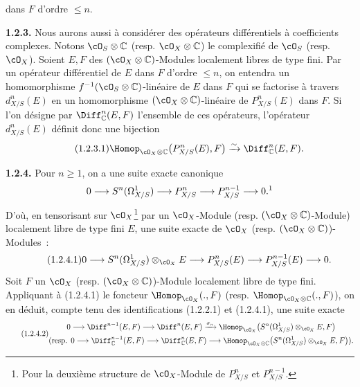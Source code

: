 dans $F$ d'ordre $\le n$.

\textbf{1.2.3.} Nous aurons aussi à considérer des opérateurs différentiels à coefficients complexes. Notons $\cO_S\otimes\mathbb C$ (resp. $\cO_X\otimes\mathbb C$) le complexifié de $\cO_S$ (resp. $\cO_X$). Soient $E,F$ des $(\cO_X\otimes\mathbb C)$-Modules localement libres de type fini. Par un opérateur différentiel de $E$ dans $F$ d'ordre $\le n$, on entendra un homomorphisme $f^{-1}(\cO_S\otimes\mathbb C)$-linéaire de $E$ dans $F$ qui se factorise à travers $d^n_{X/S}(E)$ en un homomorphisme $(\cO_X\otimes\mathbb C)$-linéaire de $P^n_{X/S}(E)$ dans $F$. Si l'on désigne par $\Diff^n_\mathbb C(E,F)$ l'ensemble de ces opérateurs, l'opérateur $d^n_{X/S}(E)$ définit donc une bijection
\begin{equation}\tag{1.2.3.1}
  \Homop_{\cO_X\otimes\mathbb C}\bigl(P^n_{X/S}(E),F\bigr)
  \xrightarrow{\sim}
  \Diff^n_\mathbb C(E,F).
\end{equation}

\textbf{1.2.4.} Pour $n\ge1$, on a une suite exacte canonique
\[
  0\longrightarrow S^n(\Omega^1_{X/S})
  \longrightarrow P^n_{X/S}
  \longrightarrow P^{n-1}_{X/S}
  \longrightarrow 0.\text{\footnotemark}
\]
%
D'où, en tensorisant sur $\cO_X$\footnote{Pour la deuxième structure de $\cO_X$-Module de $P^n_{X/S}$ et $P^{n-1}_{X/S}$.} par un $\cO_X$-Module (resp. $(\cO_X\otimes\mathbb C)$-Module) localement libre de type fini $E$, une suite exacte de $\cO_X$ (resp. $(\cO_X\otimes\mathbb C)$)-Modules~:
\begin{equation}\tag{1.2.4.1}
  0\longrightarrow S^n(\Omega^1_{X/S})\otimes_{\cO_X}E
  \longrightarrow P^n_{X/S}(E)
  \longrightarrow P^{n-1}_{X/S}(E)
  \longrightarrow 0.
\end{equation}
Soit $F$ un $\cO_X$ (resp. $(\cO_X\otimes\mathbb C)$)-Module localement libre de type fini. Appliquant à (1.2.4.1) le foncteur $\Homop_{\cO_X}(.,F)$ (resp. $\Homop_{\cO_X\otimes\mathbb C}(.,F)$), on en déduit, compte tenu des identifications (1.2.2.1) et (1.2.4.1), une suite exacte
\begin{equation}\tag{1.2.4.2}
\begin{gathered}
  0\longrightarrow \Diff^{n-1}(E,F)
  \longrightarrow \Diff^n(E,F)
  \xrightarrow{\sigma_n}
  \Homop_{\cO_X}\bigl(S^n(\Omega^1_{X/S})\otimes_{\cO_X}E,F\bigr)\\
  (\text{resp. } 0\longrightarrow \Diff^{n-1}_\mathbb C(E,F)
  \longrightarrow \Diff^n_\mathbb C(E,F)
  \longrightarrow
  \Homop_{\cO_X\otimes\mathbb C}\bigl(S^n(\Omega^1_{X/S})\otimes_{\cO_X}E,F\bigr)).
\end{gathered}
\end{equation}
